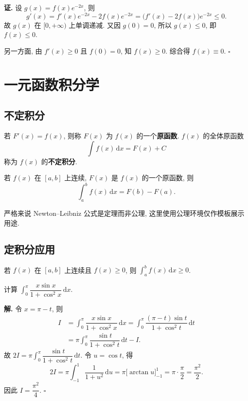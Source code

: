 \documentclass[a4paper,12pt,oneside]{maki-notes}
\begin{document}
	\textbf{证.} 设 $g(x) = f(x)e^{-2x}$, 则
	\[
	g'(x) = f'(x)e^{-2x} - 2f(x)e^{-2x} = \bigl(f'(x) - 2f(x)\bigr)e^{-2x} \le 0.
	\]
	故 $g(x)$ 在 $[0, +\infty)$ 上单调递减. 又因 $g(0) = 0$, 所以 $g(x) \le 0$, 即 $f(x) \le 0$.
	
	另一方面, 由 $f'(x) \ge 0$ 且 $f(0) = 0$, 知 $f(x) \ge 0$. 综合得 $f(x) \equiv 0$. \hfill $\square$
	
	\chapter{一元函数积分学}
	
	\section{不定积分}
	
	\begin{definition}[原函数与不定积分]
		若 $F'(x) = f(x)$, 则称 $F(x)$ 为 $f(x)$ 的一个\textbf{原函数}. $f(x)$ 的全体原函数
		\[
		\int f(x)\,\mathrm{d}x = F(x) + C
		\]
		称为 $f(x)$ 的\textbf{不定积分}.
	\end{definition}
	
	\begin{axiom}
		若 $f(x)$ 在 $[a, b]$ 上连续, $F(x)$ 是 $f(x)$ 的一个原函数, 则
		\[
		\int_a^b f(x)\,\mathrm{d}x = F(b) - F(a).
		\]
	\end{axiom}
	
	\begin{note}
		严格来说 Newton--Leibniz 公式是定理而非公理, 这里使用公理环境仅作模板展示用途.
	\end{note}
	
	\section{定积分应用}
	
	\begin{proposition}
		若 $f(x)$ 在 $[a, b]$ 上连续且 $f(x) \ge 0$, 则 $\int_a^b f(x)\,\mathrm{d}x \ge 0$.
	\end{proposition}
	
	\begin{example}
		计算 $\int_0^{\pi} \dfrac{x\sin x}{1 + \cos^2 x}\,\mathrm{d}x$.
	\end{example}
	
	\textbf{解.} 令 $x = \pi - t$, 则
	\begin{align*}
		I &= \int_0^{\pi} \dfrac{x\sin x}{1 + \cos^2 x}\,\mathrm{d}x 
		= \int_0^{\pi} \dfrac{(\pi - t)\sin t}{1 + \cos^2 t}\,\mathrm{d}t \\[6pt]
		&= \pi\int_0^{\pi}\dfrac{\sin t}{1 + \cos^2 t}\,\mathrm{d}t - I.
	\end{align*}
	故 $2I = \pi\int_0^{\pi}\dfrac{\sin t}{1 + \cos^2 t}\,\mathrm{d}t$. 令 $u = \cos t$, 得
	\[
	2I = \pi\int_{-1}^{1}\dfrac{1}{1 + u^2}\,\mathrm{d}u = \pi\bigl[\arctan u\bigr]_{-1}^{1} = \pi\cdot\dfrac{\pi}{2} = \dfrac{\pi^2}{2}.
	\]
	因此 $I = \dfrac{\pi^2}{4}$. \hfill $\square$
	
\end{document}

